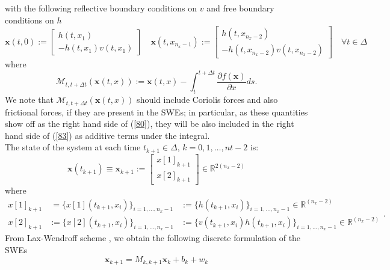 with the following reflective boundary conditions on $v$ and free boundary conditions on $h$
\begin{equation}\label{boundary_cond}
\textbf{x}(t,0):=\left[\begin{array}{ll}h(t,x_{1})\\
-h(t,x_{1})v(t,x_{1})
\end{array}\right]\quad
\textbf{x}(t,x_{n_{x}-1}):=\left[\begin{array}{ll}h(t,x_{n_{x}-2})\\
-h(t,x_{n_{x}-2})v(t,x_{n_{x}-2})
\end{array}\right] \quad \forall t\in \Delta
\end{equation} 
where
\begin{equation}\label{83}
\mathcal{M}_{t,t+\Delta t}(\textbf{x}(t,x)):=\textbf{x}(t,x)-\int_{t}^{t+\Delta t} \frac{\partial f(\textbf{x})}{\partial x} ds.
\end{equation}
We note that  $\mathcal{M}_{t,t+\Delta t}(\textbf{x}(t,x))$ should include Coriolis forces and also frictional forces, if they are present in the SWEs; in particular, as these quantities  show off as the right hand side of (\ref{80}), they will be also included in the right hand side of (\ref{83}) as additive terms under  the integral. \\ 
The state of the system at each time $t_{k+1}\in \Delta$, $k=0,1,\ldots,nt-2$ is:
\begin{equation}
\textbf{x}(t_{k+1})\equiv \textbf{x}_{k+1}:=\left[\begin{array}{lll}
x[1]_{k+1}\\
x[2]_{k+1}  
\end{array}\right]\in \mathbb{R}^{2(n_{x}-2)}
\end{equation}
where
\begin{equation}
 \begin{array}{lll}
  x[1]_{k+1}&\:= \{x[1](t_{k+1},x_{i})\}_{i=1,\ldots,n_{x}-1} &:=\{h(t_{k+1},x_{i})\}_{i=1,\ldots,n_{x}-1} \in \mathbb{R}^{(n_{x}-2)} \\ x[2]_{k+1}&:= \{x[2](t_{k+1},x_{i})\}_{i=1,\ldots,n_{x}-1}&:=\{v(t_{k+1},x_{i})h(t_{k+1},x_{i})\}_{i=1,\ldots,n_{x}-1} \in \mathbb{R}^{(n_{x}-2)} 
 \end{array}.
 \end{equation}
\noindent From  Lax-Wendroff scheme \cite{LeVeque}, we obtain the following discrete formulation of the SWEs
\begin{equation}\label{modello_swes}
\textbf{x}_{k+1}=M_{k,k+1}\textbf{x}_{k}+b_{k}+w_{k}
\end{equation}
